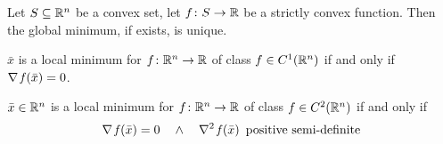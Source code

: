 \begin{prop}\label{prop:min_unique}
	Let $S\subseteq\mathbb{R}^n$ be a convex set, let $f\colon S\to\mathbb{R}$ be a strictly convex function. Then the global minimum, if exists, is unique.
\end{prop}

\begin{prop}
	$\bar{x}$ is a local minimum for $f\colon\mathbb{R}^n\to\mathbb{R}$ of class $f\in C^1(\mathbb{R}^n)$ if and only if $\nabla\operatorname*{\mathit{f}}(\bar{x})=0$.
\end{prop}

\begin{prop}\label{prop:opt_second}
	$\bar{x}\in\mathbb{R}^n$ is a local minimum for $f\colon\mathbb{R}^n\to\mathbb{R}$ of class $f\in C^2(\mathbb{R}^n)$ if and only if
	\[\nabla\operatorname*{\mathit{f}}(\bar{x})=0\quad\wedge\quad \nabla^2\operatorname*{\mathit{f}}(\bar{x})\,\,\,\text{positive semi-definite}\]
\end{prop}

